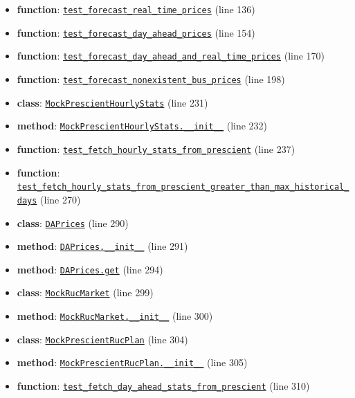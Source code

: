 \documentclass[11pt]{report}
\begin{document}
\begin{itemize}[leftmargin=*]
  \item \textbf{function}: \hyperref[def:tests-test_backcaster.py:test_forecast_real_time_prices:L136]{\texttt{test\_forecast\_real\_time\_prices}} (line 136)
  \item \textbf{function}: \hyperref[def:tests-test_backcaster.py:test_forecast_day_ahead_prices:L154]{\texttt{test\_forecast\_day\_ahead\_prices}} (line 154)
  \item \textbf{function}: \hyperref[def:tests-test_backcaster.py:test_forecast_day_ahead_and_real_time_prices:L170]{\texttt{test\_forecast\_day\_ahead\_and\_real\_time\_prices}} (line 170)
  \item \textbf{function}: \hyperref[def:tests-test_backcaster.py:test_forecast_nonexistent_bus_prices:L198]{\texttt{test\_forecast\_nonexistent\_bus\_prices}} (line 198)
  \item \textbf{class}: \hyperref[def:tests-test_backcaster.py:MockPrescientHourlyStats:L231]{\texttt{MockPrescientHourlyStats}} (line 231)
  \item \textbf{method}: \hyperref[def:tests-test_backcaster.py:MockPrescientHourlyStats.__init__:L232]{\texttt{MockPrescientHourlyStats.\_\_init\_\_}} (line 232)
  \item \textbf{function}: \hyperref[def:tests-test_backcaster.py:test_fetch_hourly_stats_from_prescient:L237]{\texttt{test\_fetch\_hourly\_stats\_from\_prescient}} (line 237)
  \item \textbf{function}: \hyperref[def:tests-test_backcaster.py:test_fetch_hourly_stats_from_prescient_greater_than_max_historical_days:L270]{\texttt{test\_fetch\_hourly\_stats\_from\_prescient\_greater\_than\_max\_historical\_days}} (line 270)
  \item \textbf{class}: \hyperref[def:tests-test_backcaster.py:DAPrices:L290]{\texttt{DAPrices}} (line 290)
  \item \textbf{method}: \hyperref[def:tests-test_backcaster.py:DAPrices.__init__:L291]{\texttt{DAPrices.\_\_init\_\_}} (line 291)
  \item \textbf{method}: \hyperref[def:tests-test_backcaster.py:DAPrices.get:L294]{\texttt{DAPrices.get}} (line 294)
  \item \textbf{class}: \hyperref[def:tests-test_backcaster.py:MockRucMarket:L299]{\texttt{MockRucMarket}} (line 299)
  \item \textbf{method}: \hyperref[def:tests-test_backcaster.py:MockRucMarket.__init__:L300]{\texttt{MockRucMarket.\_\_init\_\_}} (line 300)
  \item \textbf{class}: \hyperref[def:tests-test_backcaster.py:MockPrescientRucPlan:L304]{\texttt{MockPrescientRucPlan}} (line 304)
  \item \textbf{method}: \hyperref[def:tests-test_backcaster.py:MockPrescientRucPlan.__init__:L305]{\texttt{MockPrescientRucPlan.\_\_init\_\_}} (line 305)
  \item \textbf{function}: \hyperref[def:tests-test_backcaster.py:test_fetch_day_ahead_stats_from_prescient:L310]{\texttt{test\_fetch\_day\_ahead\_stats\_from\_prescient}} (line 310)
\end{itemize}
\end{document}
